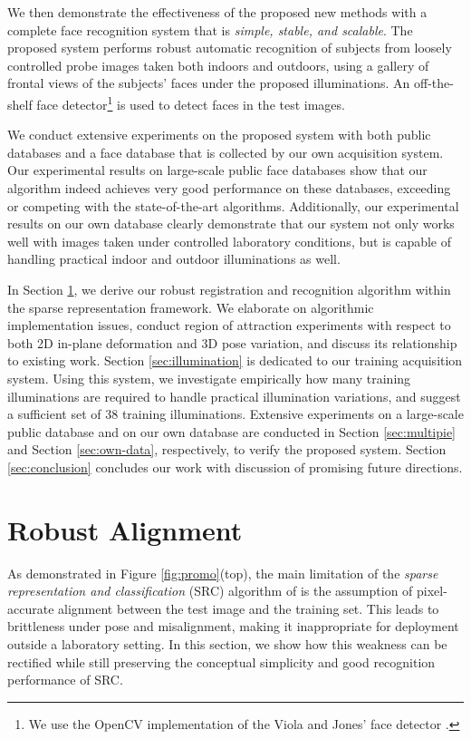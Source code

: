 \documentclass[10pt,journal,letterpaper,compsoc]{IEEEtran} %
\begin{document}
We then demonstrate the effectiveness of the proposed new
methods with a complete face recognition system that is {\em
simple, stable, and scalable}. The proposed system performs
robust automatic recognition of subjects from loosely
controlled probe images taken both indoors and outdoors,
using a gallery of
frontal views of the subjects' faces under the proposed
illuminations. An off-the-shelf face
detector\footnote{We use the OpenCV
implementation of the Viola and Jones' face detector
\cite{Viola2004-IJCV}.} is used to detect faces in the test images.

We conduct extensive experiments on the proposed system with
both public databases and a face database that is collected by
our own acquisition system. Our experimental results on
large-scale public face databases show that our algorithm
indeed achieves very good performance on these databases,
exceeding or competing with the state-of-the-art algorithms.
Additionally, our experimental results on our own database
clearly demonstrate that our system not only works well with
images taken under controlled laboratory conditions, but is
capable of handling practical indoor and outdoor illuminations as well.

 In Section \ref{sec:registration},
we derive our robust registration and recognition algorithm within the sparse
representation framework. We elaborate on algorithmic implementation issues,
conduct region of attraction experiments with respect to both 2D in-plane
deformation and 3D pose variation, and discuss its relationship to existing
work. Section \ref{sec:illumination} is dedicated to our training acquisition
system. Using this system, we investigate empirically how many training
illuminations are required to handle practical illumination variations, and
suggest a sufficient set of 38 training illuminations. Extensive experiments on
a large-scale public database and on our own database are conducted in Section
\ref{sec:multipie} and Section \ref{sec:own-data}, respectively, to verify the
proposed system. Section \ref{sec:conclusion} concludes our work with
discussion of promising future directions.

\section{Robust Alignment}\label{sec:registration}
As demonstrated in Figure \ref{fig:promo}(top), the main
limitation of the {\em sparse representation and
classification} (SRC) algorithm of \cite{Wright2009-PAMI} is
the assumption of pixel-accurate alignment between the test
image and the training set. This leads to brittleness under
pose and misalignment, making it inappropriate for deployment
outside a laboratory setting. In this section, we show how this
weakness can be rectified while still preserving the conceptual
simplicity and good recognition performance of SRC.
\end{document}
